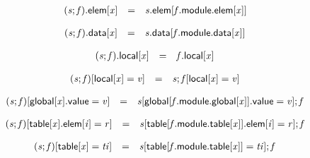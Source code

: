 $$
\begin{array}{@{}lcl@{}l@{}}
{({\mathit{s}} ; {\mathit{f}}).\mathsf{elem}}{{}[{\mathit{x}}]} &=& {\mathit{s}}.\mathsf{elem}{}[{\mathit{f}}.\mathsf{module}.\mathsf{elem}{}[{\mathit{x}}]] &  \\
\end{array}
$$

$$
\begin{array}{@{}lcl@{}l@{}}
{({\mathit{s}} ; {\mathit{f}}).\mathsf{data}}{{}[{\mathit{x}}]} &=& {\mathit{s}}.\mathsf{data}{}[{\mathit{f}}.\mathsf{module}.\mathsf{data}{}[{\mathit{x}}]] &  \\
\end{array}
$$

$$
\begin{array}{@{}lcl@{}l@{}}
{({\mathit{s}} ; {\mathit{f}}).\mathsf{local}}{{}[{\mathit{x}}]} &=& {\mathit{f}}.\mathsf{local}{}[{\mathit{x}}] &  \\
\end{array}
$$

\vspace{1ex}

$$
\begin{array}{@{}lcl@{}l@{}}
({\mathit{s}} ; {\mathit{f}}){}[\mathsf{local}{}[{\mathit{x}}] = {\mathit{v}}] &=& {\mathit{s}} ; {\mathit{f}}{}[\mathsf{local}{}[{\mathit{x}}] = {\mathit{v}}] &  \\
\end{array}
$$

$$
\begin{array}{@{}lcl@{}l@{}}
({\mathit{s}} ; {\mathit{f}}){}[\mathsf{global}{}[{\mathit{x}}].\mathsf{value} = {\mathit{v}}] &=& {\mathit{s}}{}[\mathsf{global}{}[{\mathit{f}}.\mathsf{module}.\mathsf{global}{}[{\mathit{x}}]].\mathsf{value} = {\mathit{v}}] ; {\mathit{f}} &  \\
\end{array}
$$

$$
\begin{array}{@{}lcl@{}l@{}}
({\mathit{s}} ; {\mathit{f}}){}[\mathsf{table}{}[{\mathit{x}}].\mathsf{elem}{}[{\mathit{i}}] = {\mathit{r}}] &=& {\mathit{s}}{}[\mathsf{table}{}[{\mathit{f}}.\mathsf{module}.\mathsf{table}{}[{\mathit{x}}]].\mathsf{elem}{}[{\mathit{i}}] = {\mathit{r}}] ; {\mathit{f}} &  \\
\end{array}
$$

$$
\begin{array}{@{}lcl@{}l@{}}
({\mathit{s}} ; {\mathit{f}}){}[\mathsf{table}{}[{\mathit{x}}] = {\mathit{ti}}] &=& {\mathit{s}}{}[\mathsf{table}{}[{\mathit{f}}.\mathsf{module}.\mathsf{table}{}[{\mathit{x}}]] = {\mathit{ti}}] ; {\mathit{f}} &  \\
\end{array}
$$

